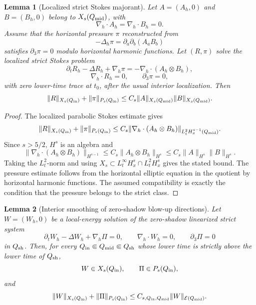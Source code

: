 \documentclass[11pt]{article}
\numberwithin{equation}{section}
\theoremstyle{plain}
\newtheorem{lemma}{Lemma}[section]
\theoremstyle{definition}
\theoremstyle{remark}
\newcommand{\nabh}{\nabla_h}
\newcommand{\calE}{\mathcal E}
\begin{document}
\begin{lemma}[Localized strict Stokes majorant]
\label{pIII:lem:localized-strict-stokes-majorant}
Let \(A=(A_h,0)\) and \(B=(B_h,0)\) belong to \(X_s(Q_{\rm mid})\), with
\[
        \nabh\cdot A_h=\nabh\cdot B_h=0.
\]
Assume that the horizontal pressure \(\pi\) reconstructed from
\[
        -\Delta_h\pi=\partial_a\partial_b(A_aB_b)
\]
satisfies \(\partial_3\pi=0\) modulo horizontal harmonic functions.  Let \((R,\pi)\) solve the
localized strict Stokes problem
\[
        \partial_tR_h-\Delta R_h+\nabh\pi
        =-\nabh\cdot(A_h\otimes B_h),
\]
\[
        \nabh\cdot R_h=0,\qquad \partial_3\pi=0,
\]
with zero lower-time trace at \(t_0\), after the usual interior localization.  Then
\[
        \|R\|_{X_s(Q_{\rm in})}+\|\pi\|_{P_s(Q_{\rm in})}
        \le C_s\|A\|_{X_s(Q_{\rm mid})}\|B\|_{X_s(Q_{\rm mid})}.
\]
\end{lemma}

\begin{proof}
The localized parabolic Stokes estimate gives
\[
        \|R\|_{X_s(Q_{\rm in})}+\|\pi\|_{P_s(Q_{\rm in})}
        \le C_s
        \|\nabh\cdot(A_h\otimes B_h)\|_{L^2_tH^{s-1}_x(Q_{\rm mid})}.
\]
Since \(s>5/2\), \(H^s\) is an algebra and
\[
        \|\nabh\cdot(A_h\otimes B_h)\|_{H^{s-1}}
        \le C_s\|A_h\otimes B_h\|_{H^s}
        \le C_s\|A\|_{H^s}\|B\|_{H^s}.
\]
Taking the \(L^2_t\)-norm and using \(X_s\subset L^\infty_tH^s_x\cap L^2_tH^s_x\) gives the stated
bound.  The pressure estimate follows from the horizontal elliptic equation in the quotient by
horizontal harmonic functions.  The assumed compatibility is exactly the condition that the pressure
belongs to the strict class.
\end{proof}

\begin{lemma}[Interior smoothing of zero-shadow blow-up directions]
\label{pIII:lem:zero-shadow-interior-smoothing}
Let \(W=(W_h,0)\) be a local-energy solution of the zero-shadow linearized strict system
\[
        \partial_tW_h-\Delta W_h+\nabh\Pi=0,
        \qquad
        \nabh\cdot W_h=0,
        \qquad
        \partial_3\Pi=0
\]
in \(Q_{\rm sh}\).  Then, for every \(Q_{\rm in}\Subset Q_{\rm mid}\Subset Q_{\rm sh}\) whose lower
time is strictly above the lower time of \(Q_{\rm sh}\),
\[
        W\in X_s(Q_{\rm in}),\qquad \Pi\in P_s(Q_{\rm in}),
\]
and
\[
        \|W\|_{X_s(Q_{\rm in})}+\|\Pi\|_{P_s(Q_{\rm in})}
        \le C_{s,Q_{\rm in},Q_{\rm mid}}\|W\|_{\calE(Q_{\rm mid})}.
\]
\end{lemma}
\end{document}

